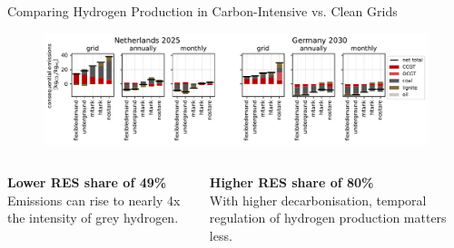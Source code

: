 \begin{frame}{Comparing Hydrogen Production in Carbon-Intensive vs. Clean Grids}
	\begin{figure}
		\centering
		\includegraphics[width=0.9\linewidth]{images/consequential_emissions_by_carrier_3200_cleanness}
	\end{figure}
	\begin{columns}[T]
		\begin{column}{0.48\textwidth}
			\centering
			\textbf{Lower RES share of 49\%} \\
			\alert{Emissions} can \alert{rise} to nearly \alert{4x} the intensity of \alert{grey hydrogen}.
		\end{column}
		
		\begin{column}{0.48\textwidth}
			\centering
			\textbf{Higher RES share of 80\%} \\
			With \alert{higher decarbonisation}, temporal \alert{regulation} of hydrogen production matters \alert{less}.
			
		\end{column}
	\end{columns}
\end{frame}

